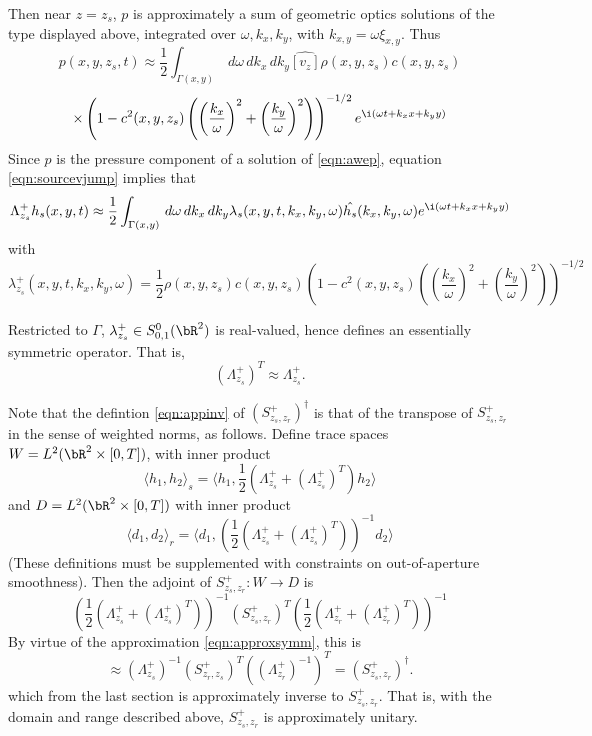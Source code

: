 Then near $z=z_s$, $p$ is approximately a sum of geometric optics solutions of the type displayed above, integrated over $\omega,k_x,k_y$, with $k_{x,y} = \omega \xi_{x,y}$.  Thus
\[
  p(x,y,z_s,t) \approx \frac{1}{2}\int_{\Gamma(x,y)} \,d\omega\,dk_x\,dk_y \hat{[v_z]}\rho(x,y,z_s)c(x,y,z_s)
\]
\[
   \times \left(1-c^2(x,y,z_s)\left(\left(\frac{k_x}{\omega}\right)^2 + \left(\frac{k_y}{\omega}\right) ^2\right)\right)^{-1/2}e^{\i(\omega t + k_x x+ k_y y)}
\]
Since $p$ is the pressure component of a solution of \ref{eqn:awep}, equation \ref{eqn:sourcevjump} implies that
\begin{equation}
  \label{eqn:psidodton}
  \Lambda^+_{z_s} h_s(x,y,t) \approx \frac{1}{2}\int_{\Gamma(x,y)} \,d\omega\,dk_x\,dk_y
  \lambda_s(x,y,t,k_x,k_y,\omega) \hat{h_s}(k_x,k_y,\omega) e^{\i(\omega t + k_x x+ k_y y)}
\end{equation}
with
\begin{equation}
  \label{eqn:symboldton}
  \lambda^+_{z_s}(x,y,t,k_x,k_y,\omega) =\frac{1}{2}\rho(x,y,z_s)c(x,y,z_s)\left(1-c^2(x,y,z_s)\left(\left(\frac{k_x}{\omega}\right)^2 + \left(\frac{k_y}{\omega}\right) ^2\right)\right)^{-1/2}
\end{equation}

Restricted to $\Gamma$, $\lambda^+_{z_s} \in S^0_{0,1}(\bR^2)$ is real-valued, hence defines an essentially symmetric operator. That is,
\begin{equation}
  \label{eqn:approxsymm}
  (\Lambda^+_{z_s})^T \approx \Lambda^{+}_{z_s}.
\end{equation}

Note that the defintion \ref{eqn:appinv} of $ (S^+_{z_s,z_r})^{\dagger} $ is that of
the transpose of $S^+_{z_s,z_r}$ in the sense of weighted norms, as
follows. Define trace spaces $W=L^2(\bR^2 \times [0,T])$, with inner product
\[
  \langle h_1,h_2\rangle_s = \langle
  h_1,\frac{1}{2}(\Lambda^+_{z_s}+(\Lambda^+_{z_s})^T)h_2\rangle
\]
and $D=L^2(\bR^2 \times [0,T])$ with inner product
\[
  \langle d_1,d_2\rangle_r = \langle
  d_1,\left(\frac{1}{2}(\Lambda^+_{z_s}+(\Lambda^+_{z_s})^T)\right)^{-1}d_2\rangle
\]
(These definitions must be supplemented with constraints on
out-of-aperture smoothness). Then the adjoint of $S^+_{z_s,z_r}: W
\rightarrow D$ is
\[
 \left(\frac{1}{2}
   (\Lambda^+_{z_s}+(\Lambda^+_{z_s})^T)\right)^{-1}(S^+_{z_s,z_r})^T
 \left(\frac{1}{2}(\Lambda^+_{z_r}+(\Lambda^+_{z_r})^T)\right)^{-1}
\]
 By virtue of the approximation \ref{eqn:approxsymm}, this is
\[
   \approx
   (\Lambda^{+}_{z_s})^{-1}(S^{+}_{z_r,z_s})^T((\Lambda^{+}_{z_r})^{-1})^T
   = (S^+_{z_s,z_r})^{\dagger}.
\]
which from the last section is approximately inverse to
$S^+_{z_s,z_r}$. That is, with the domain and range described above,
$S^+_{z_s,z_r}$ is approximately unitary.

